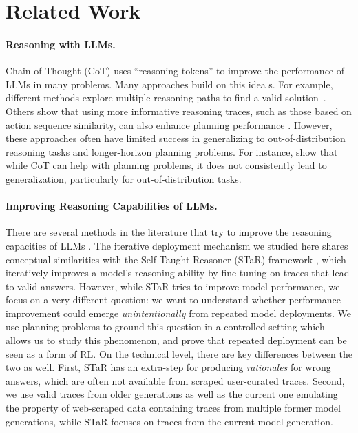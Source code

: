 \documentclass{article}
\renewcommand{\cite}[1]{\citep[][]{#1}}
\newcommand{\egcite}[1]{\citep[e.g.,][]{#1}}
\begin{document}


\section{Related Work}

\paragraph{Reasoning with LLMs.}

Chain-of-Thought (CoT) \citep{wei-et-al-neurips2022} uses ``reasoning tokens''
to improve the performance of LLMs in many problems.  Many approaches build on
this idea \egcite{yao-et-al-neurips2023,sel2024algorithm}s. For example,
different methods explore multiple reasoning paths to find a valid
solution~\citep{yao-et-al-neurips2023,snell-et-al-icrl2025}. Others show that
using more informative reasoning traces, such as those based on action sequence
similarity, can also enhance planning performance \citep{zhao-et-al-icrl2025}.
However, these approaches often have limited success in generalizing to
out-of-distribution reasoning tasks and longer-horizon planning problems. For
instance, \citet{stechly-et-al-neurips2024} show that while CoT can help with
planning problems, it does not consistently lead to generalization, particularly
for out-of-distribution tasks.

\paragraph{Improving Reasoning Capabilities of LLMs.}

There are several methods in the literature that try to improve the reasoning
capacities of LLMs
\egcite{zhang-et-al-neurips2024,muennighoff-et-al-arxiv2025,wen-et-al-arxiv2025}. The
iterative deployment mechanism we studied here shares conceptual similarities
with the Self-Taught Reasoner (STaR) framework
\cite{zelikman-et-al-neurips2022}, which iteratively improves a model's
reasoning ability by fine-tuning on traces that lead to valid answers.
However, while STaR tries to improve model performance, we focus on a very
different question: we want to understand whether performance improvement could
emerge \emph{unintentionally} from repeated model deployments. We use planning
problems to ground this question in a controlled setting which allows us to
study this phenomenon, and prove that repeated deployment can be seen as a form
of RL. On the technical level, there are key differences between the two as
well.  First, STaR has an extra-step for producing \emph{rationales} for
wrong answers, which are often not available from scraped user-curated
traces. Second, we use valid traces from older generations as well as the
current one emulating the property of web-scraped data containing traces from
multiple former model generations, while STaR focuses on traces from the current
model generation.
\end{document}
